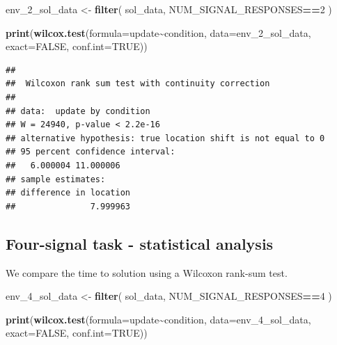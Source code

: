 \documentclass[
]{book}
\newenvironment{Shaded}{\begin{snugshade}}{\end{snugshade}}
\newcommand{\DataTypeTok}[1]{\textcolor[rgb]{0.13,0.29,0.53}{#1}}
\newcommand{\DecValTok}[1]{\textcolor[rgb]{0.00,0.00,0.81}{#1}}
\newcommand{\KeywordTok}[1]{\textcolor[rgb]{0.13,0.29,0.53}{\textbf{#1}}}
\newcommand{\NormalTok}[1]{#1}
\newcommand{\OperatorTok}[1]{\textcolor[rgb]{0.81,0.36,0.00}{\textbf{#1}}}
\newcommand{\OtherTok}[1]{\textcolor[rgb]{0.56,0.35,0.01}{#1}}
\newcommand{\StringTok}[1]{\textcolor[rgb]{0.31,0.60,0.02}{#1}}
\begin{document}
\begin{Shaded}
\begin{Highlighting}[]
\NormalTok{env\_}\DecValTok{2}\NormalTok{\_sol\_data \textless{}{-}}\StringTok{ }\KeywordTok{filter}\NormalTok{(}
\NormalTok{  sol\_data,}
\NormalTok{  NUM\_SIGNAL\_RESPONSES}\OperatorTok{==}\DecValTok{2}
\NormalTok{)}

\KeywordTok{print}\NormalTok{(}\KeywordTok{wilcox.test}\NormalTok{(}\DataTypeTok{formula=}\NormalTok{update}\OperatorTok{\textasciitilde{}}\NormalTok{condition, }\DataTypeTok{data=}\NormalTok{env\_}\DecValTok{2}\NormalTok{\_sol\_data, }\DataTypeTok{exact=}\OtherTok{FALSE}\NormalTok{, }\DataTypeTok{conf.int=}\OtherTok{TRUE}\NormalTok{))}
\end{Highlighting}
\end{Shaded}

\begin{verbatim}
## 
##  Wilcoxon rank sum test with continuity correction
## 
## data:  update by condition
## W = 24940, p-value < 2.2e-16
## alternative hypothesis: true location shift is not equal to 0
## 95 percent confidence interval:
##   6.000004 11.000006
## sample estimates:
## difference in location 
##               7.999963
\end{verbatim}

\hypertarget{four-signal-task---statistical-analysis}{%
\subsection{Four-signal task - statistical analysis}\label{four-signal-task---statistical-analysis}}

We compare the time to solution using a Wilcoxon rank-sum test.

\begin{Shaded}
\begin{Highlighting}[]
\NormalTok{env\_}\DecValTok{4}\NormalTok{\_sol\_data \textless{}{-}}\StringTok{ }\KeywordTok{filter}\NormalTok{(}
\NormalTok{  sol\_data,}
\NormalTok{  NUM\_SIGNAL\_RESPONSES}\OperatorTok{==}\DecValTok{4}
\NormalTok{)}

\KeywordTok{print}\NormalTok{(}\KeywordTok{wilcox.test}\NormalTok{(}\DataTypeTok{formula=}\NormalTok{update}\OperatorTok{\textasciitilde{}}\NormalTok{condition, }\DataTypeTok{data=}\NormalTok{env\_}\DecValTok{4}\NormalTok{\_sol\_data, }\DataTypeTok{exact=}\OtherTok{FALSE}\NormalTok{, }\DataTypeTok{conf.int=}\OtherTok{TRUE}\NormalTok{))}
\end{Highlighting}
\end{Shaded}
\end{document}
